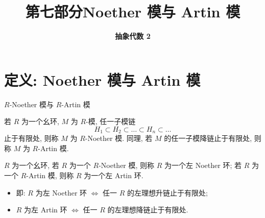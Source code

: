 \everymath{\displaystyle}



\title[第七部分\\
Noether 模与 Artin 模]{\texorpdfstring{\LARGE \bfseries 第七部分\quad Noether 模与 Artin 模}{第七部分 Noether 模与 Artin 模}}
\author[抽象代数 2]{\Large \bfseries 抽象代数 2}
\date{}





\begin{frame}

\titlepage %

\end{frame}


\section[定义]{定义: Noether 模与 Artin 模}


\begin{frame}{$R$-Noether 模与 $R$-Artin 模}

\begin{Def}
若 $R$ 为一个幺环, $M$ 为 $R$-模, 任一子模链
\[
H_1 \subset H_2 \subset \dots \subset H_n \subset \dots
\]
止于有限处, 则称 $M$ 为 $R$-Noether 模.
同理, 若 $M$ 的任一子模降链止于有限处, 则称 $M$ 为 $R$-Artin 模.
\end{Def}

\pause

\begin{Def}
$R$ 为一个幺环, 若 $R$ 为一个 $R$-Noether 模, 则称 $R$ 为一个左 Noether 环;
若 $R$ 为一个 $R$-Artin 模, 则称 $R$ 为一个左 Artin 环.
\end{Def}

\pause

\begin{itemize}
\item 即: $R$ 为左 Noether 环 $\iff$ 任一 $R$ 的左理想升链止于有限处;
\item $R$ 为左 Artin 环 $\iff$ 任一 $R$ 的左理想降链止于有限处.
\end{itemize}

\end{frame}

